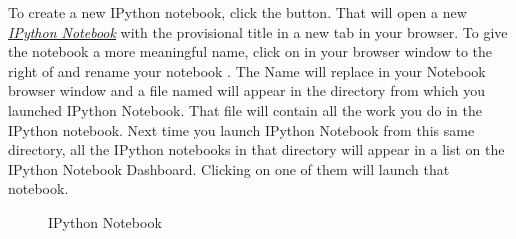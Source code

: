 \documentclass[letterpaper,10pt,english]{sphinxmanual}
\begin{document}
To create a new IPython notebook, click the  button.  That will open a new {\hyperref[apdx2/apdx2_ipynb:fig-ipynotebook]{\emph{IPython Notebook}}} with the provisional title  in a new tab in your browser.  To give the notebook a more meaningful name, click on  in your browser window to the right of  and  rename your notebook .  The Name  will replace  in your Notebook browser window and a file named  will appear in the directory from which you launched IPython Notebook.  That file will contain all the work you do in the IPython notebook.  Next time you launch IPython Notebook from this same directory, all the IPython notebooks in that directory will appear in a list on the IPython Notebook Dashboard.  Clicking on one of them will launch that notebook.
\begin{figure}[htbp]
\centering
\capstart

\caption{IPython Notebook}\label{apdx2/apdx2_ipynb:fig-ipynotebook}\end{figure}
\end{document}
